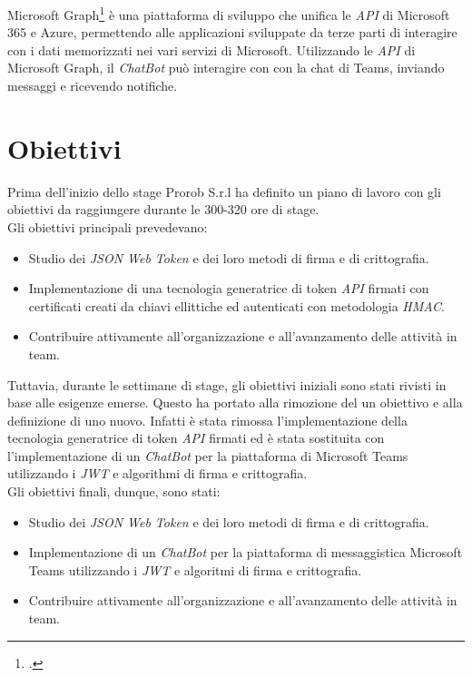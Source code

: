 Microsoft Graph\footcite{site:microsoft-graph} è una piattaforma di sviluppo che unifica le \emph{API} di Microsoft 365 e Azure, permettendo alle applicazioni sviluppate da terze parti di interagire con i dati memorizzati nei vari servizi di Microsoft.
Utilizzando le \emph{API} di Microsoft Graph, il \emph{ChatBot} può interagire con con la chat di Teams, inviando messaggi e ricevendo notifiche.

\section{Obiettivi}
Prima dell'inizio dello stage Prorob S.r.l ha definito un piano di lavoro con gli obiettivi da raggiungere durante le 300-320 ore di stage. \\

\noindent Gli obiettivi principali prevedevano:
\begin{itemize}
	\item Studio dei \emph{JSON Web Token} e dei loro metodi di firma e di crittografia.
	\item Implementazione di una tecnologia generatrice di token \emph{API} firmati con certificati creati da chiavi ellittiche ed autenticati con metodologia \emph{HMAC}.
	\item Contribuire attivamente all'organizzazione e all'avanzamento delle attività in team.
\end{itemize}

Tuttavia, durante le settimane di stage, gli obiettivi iniziali sono stati rivisti in base alle esigenze emerse. Questo ha portato alla rimozione del un obiettivo e alla definizione di uno nuovo.
Infatti è stata rimossa l'implementazione della tecnologia generatrice di token \emph{API} firmati ed è stata sostituita con l'implementazione di un \emph{ChatBot} per la piattaforma di Microsoft Teams utilizzando i \emph{JWT} e algorithmi di firma e crittografia. \\

\noindent Gli obiettivi finali, dunque, sono stati:
\begin{itemize}
	\item Studio dei \emph{JSON Web Token} e dei loro metodi di firma e di crittografia.
	\item Implementazione di un \emph{ChatBot} per la piattaforma di messaggistica Microsoft Teams utilizzando i \emph{JWT} e algoritmi di firma e crittografia.
	\item Contribuire attivamente all'organizzazione e all'avanzamento delle attività in team.
\end{itemize}